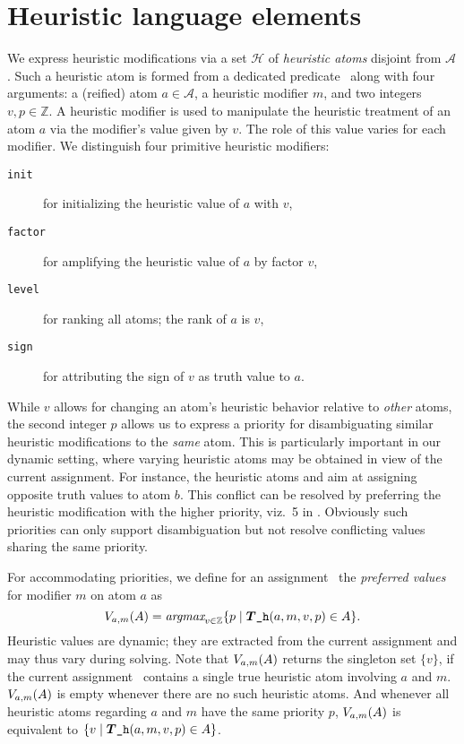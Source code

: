 
\section{Heuristic language elements}\label{sec:approach}

We express heuristic modifications via a set $\mathcal{H}$ of \emph{heuristic atoms} 
disjoint from $\mathcal{A}$.
Such a heuristic atom is formed from a dedicated predicate \hpredicate\ along with four arguments:
a (reified) atom $a\in\mathcal{A}$,
a heuristic modifier $m$,
and two  integers $v,p\in\mathbb{Z}$.
A heuristic modifier is used to manipulate the heuristic treatment of an atom $a$ via the 
modifier's value given by $v$.
The role of this value varies for each modifier.
We distinguish four primitive heuristic modifiers:
\begin{description}
\item [\texttt{init}] for initializing the heuristic value of $a$ with $v$,
\item [\texttt{factor}] for amplifying the heuristic value of $a$ by factor $v$,
\item [\texttt{level}] for ranking all atoms; the rank of $a$ is $v$,
\item [\texttt{sign}] for attributing the sign of $v$ as truth value to $a$.
\end{description}
While $v$ allows for changing an atom's heuristic behavior relative to \emph{other} atoms,
the second integer $p$ allows us to express a priority for disambiguating similar
heuristic modifications to the \emph{same} atom.
This is particularly important in our dynamic setting, where varying heuristic atoms may be obtained
in view of the current assignment.
For instance, the heuristic atoms
and
aim at assigning opposite truth values to atom $b$.
This conflict can be resolved by preferring the heuristic modification with the higher priority,
viz.\ 5 in .
Obviously such priorities can only support disambiguation but not resolve conflicting values sharing the same priority.

For accommodating priorities,
we define for an assignment \ass\ the \emph{preferred values} for modifier $m$ on atom $a$ as
\[
V_{a,m}(A)=
\textit{argmax}_{v\in\mathbb{Z}}\{p\mid\boldsymbol{T}{\texttt{\_h}(a,{m},v,p)}\in A\}.
\]
Heuristic values are dynamic;
they are extracted from the current assignment and may thus vary during solving.
Note that $V_{a,m}(A)$ returns the singleton set $\{v\}$,
if the current assignment \ass\ contains a single true heuristic atom  
involving $a$ and $m$.
$V_{a,m}(A)$ is empty whenever there are no such heuristic atoms.
%
And whenever all heuristic atoms regarding $a$ and $m$ have the same priority $p$,
$V_{a,m}(A)$ is equivalent to
\(
\{v\mid\boldsymbol{T}{\texttt{\_h}(a,{m},v,p)}\in A\}
\).

